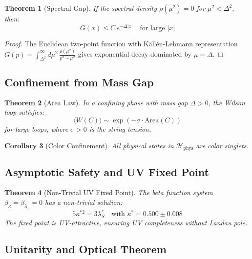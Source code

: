 \documentclass[11pt,a4paper]{article}
\providecommand{\Hilbert}{\mathcal{H}}
\theoremstyle{plain}
\newtheorem{theorem}{Theorem}[section]
\newtheorem{corollary}[theorem]{Corollary}
\theoremstyle{definition}
\begin{document}
\begin{theorem}[Spectral Gap]
\label{thm:spectral_gap}
If the spectral density $\rho(\mu^2) = 0$ for $\mu^2 < \Delta^2$, then:
\begin{equation}
G(x) \leq C\, e^{-\Delta|x|} \quad \text{for large } |x|
\end{equation}
\end{theorem}

\begin{proof}
The Euclidean two-point function with Källén-Lehmann representation $G(p) = \int_{\Delta^2}^\infty d\mu^2\, \frac{\rho(\mu^2)}{p^2 + \mu^2}$ gives exponential decay dominated by $\mu = \Delta$.
\end{proof}
\vspace{0.3em}
\subsection{Confinement from Mass Gap}

\begin{theorem}[Area Law]
\label{thm:area_law}
In a confining phase with mass gap $\Delta > 0$, the Wilson loop satisfies:
\begin{equation}
\langle W(C) \rangle \sim \exp(-\sigma \cdot \mathrm{Area}(C))
\end{equation}
for large loops, where $\sigma > 0$ is the string tension.
\end{theorem}

\begin{corollary}[Color Confinement]
All physical states in $\Hilbert_{\mathrm{phys}}$ are color singlets.
\end{corollary}

\subsection{Asymptotic Safety and UV Fixed Point}

\begin{theorem}[Non-Trivial UV Fixed Point]
\label{thm:uv_fp}
The beta function system $\beta_\kappa = \beta_{\lambda_S} = 0$ has a non-trivial solution:
\begin{equation}
5\kappa^{*2} = 3\lambda_S^* \quad \text{with } \kappa^* = 0.500 \pm 0.008
\end{equation}
The fixed point is UV-attractive, ensuring UV completeness without Landau pole.
\end{theorem}

\subsection{Unitarity and Optical Theorem}
\end{document}
